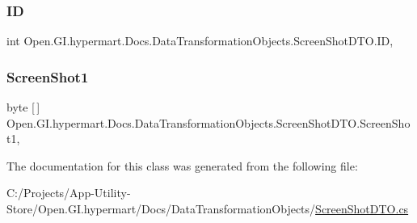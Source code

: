 \subsubsection{\texorpdfstring{ID}{ID}}
{\footnotesize\ttfamily int Open.\+G\+I.\+hypermart.\+Docs.\+Data\+Transformation\+Objects.\+Screen\+Shot\+D\+T\+O.\+ID\hspace{0.3cm}{\ttfamily [get]}, {\ttfamily [set]}}





\hypertarget{class_open_1_1_g_i_1_1hypermart_1_1_docs_1_1_data_transformation_objects_1_1_screen_shot_d_t_o_af8a951a853f5107194edf4f3fe9168a8}{}\label{class_open_1_1_g_i_1_1hypermart_1_1_docs_1_1_data_transformation_objects_1_1_screen_shot_d_t_o_af8a951a853f5107194edf4f3fe9168a8} 
\subsubsection{\texorpdfstring{Screen\+Shot1}{ScreenShot1}}
{\footnotesize\ttfamily byte \mbox{[}$\,$\mbox{]} Open.\+G\+I.\+hypermart.\+Docs.\+Data\+Transformation\+Objects.\+Screen\+Shot\+D\+T\+O.\+Screen\+Shot1\hspace{0.3cm}{\ttfamily [get]}, {\ttfamily [set]}}







The documentation for this class was generated from the following file\+:\begin{DoxyCompactItemize}
\item 
C\+:/\+Projects/\+App-\/\+Utility-\/\+Store/\+Open.\+G\+I.\+hypermart/\+Docs/\+Data\+Transformation\+Objects/\hyperlink{_screen_shot_d_t_o_8cs}{Screen\+Shot\+D\+T\+O.\+cs}\end{DoxyCompactItemize}
